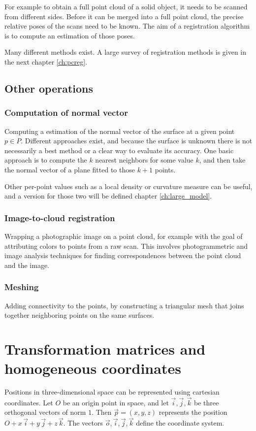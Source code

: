 For example to obtain a full point cloud of a solid object, it needs to be scanned from different sides. Before it can be merged into a full point cloud, the precise relative poses of the scans need to be known. The aim of a registration algorithm is to compute an estimation of those poses.

Many different methods exist. A large survey of registration methods is given in the next chapter \ref{ch:pcreg}.



\subsection{Other operations}

\subsubsection{Computation of normal vector}
Computing a estimation of the normal vector of the surface at a given point $p \in P$. Different approaches exist, and because the surface is unknown there is not necessarily a best method or a clear way to evaluate its accuracy. One basic approach is to compute the $k$ nearest neighbors for some value $k$, and then take the normal vector of a plane fitted to those $k + 1$ points. 

Other per-point values such as a local density or curvature measure can be useful, and a version for those two will be defined chapter \ref{ch:large_model}.


\subsubsection{Image-to-cloud registration}
Wrapping a photographic image on a point cloud, for example with the goal of attributing colors to points from a raw scan. This involves photogrammetric and image analysis techniques for finding correspondences between the point cloud and the image.


\subsubsection{Meshing}
Adding connectivity to the points, by constructing a triangular mesh that joins together neighboring points on the same surfaces. 


\section{Transformation matrices and homogeneous coordinates}
Positions in three-dimensional space can be represented using cartesian coordinates. Let $O$ be an origin point in space, and let $\vec{i}, \vec{j}, \vec{k}$ be three orthogonal vectors of norm $1$. Then $\vec{p} = (x, y, z)$ represents the position $O + x \, \vec{i} + y \, \vec{j} + z \, \vec{k}$. The vectors $\vec{o}, \vec{i}, \vec{j}, \vec{k}$ define the coordinate system.

